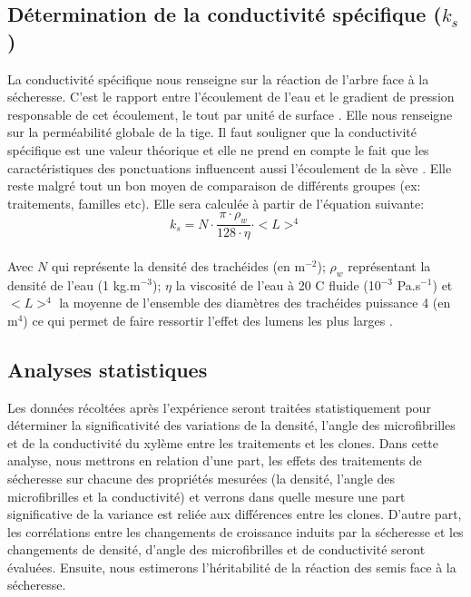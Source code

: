 \documentclass[a4paper,12pt]{report}
\begin{document}
\subsection*{Détermination de la conductivité spécifique ($k_{s}$)}
La conductivité spécifique nous renseigne sur la réaction de l'arbre face à la sécheresse. C'est le rapport entre l’écoulement de l’eau et le gradient de pression responsable de cet écoulement, le tout par unité de surface \citep{Tyree1991}. Elle nous renseigne sur la perméabilité globale de la tige. Il faut souligner que la conductivité spécifique est une valeur théorique et elle ne prend en compte le fait que les caractéristiques des ponctuations influencent aussi l'écoulement de la sève \citep{Pothier1989}. %
Elle reste malgré tout un bon moyen de comparaison de différents groupes (ex: traitements, familles etc).  Elle sera calculée à partir de l'équation suivante: \\

\begin{equation}\label{eq:2}
k_{s} = N\cdot \frac{\pi \cdot \rho_{w}}{128 \cdot \eta} \cdot <L>^{4}
\end{equation}\\

Avec $N$ qui représente la densité des trachéides (en m$^{-2}$); $\rho_{w}$ représentant la densité de l'eau (1 kg.m$^{-3}$); $\eta$ la viscosité de l'eau à 20  \textdegree C fluide (10$^{-3}$ Pa.s$^{-1}$) et $<L>^{4}$ la moyenne de l'ensemble des diamètres des trachéides puissance 4 (en m$^{4}$) ce qui permet de faire ressortir l'effet des lumens les plus larges \citep{Tyree1991}.


\subsection*{Analyses statistiques}
Les données récoltées après l'expérience seront traitées statistiquement pour déterminer la significativité des variations de la densité, l'angle des microfibrilles et de la conductivité du xylème entre les traitements et les clones. Dans cette analyse, nous mettrons en relation d'une part, les effets des traitements de sécheresse sur chacune des propriétés mesurées (la densité, l'angle des microfibrilles et la conductivité) et verrons dans quelle mesure une part significative de la variance est reliée aux différences entre les clones. D'autre part, les corrélations entre les changements de croissance induits par la sécheresse et les changements de densité, d'angle des microfibrilles et de conductivité seront évaluées. Ensuite, nous estimerons l'héritabilité de la réaction des semis face à la sécheresse. \\ 
\end{document}
